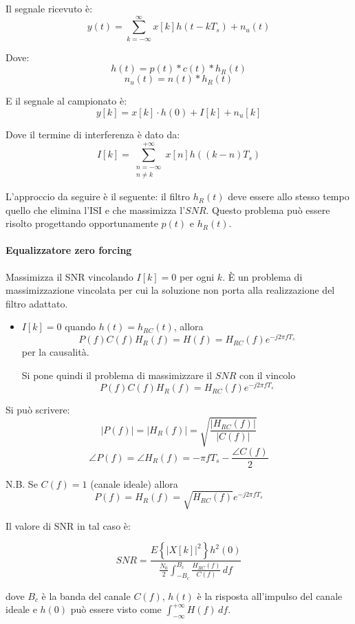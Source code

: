 \documentclass{article}
\begin{document}
Il segnale ricevuto è:
\[
y(t) = \sum_{k=-\infty}^{\infty} x[k] h(t - kT_s) + n_u(t)
\]

Dove:
\[
h(t) = p(t) * c(t) * h_R(t)
\]
\[
n_u(t) = n(t) * h_R(t)
\]

E il segnale al campionato è:
\[
y[k] = x[k] \cdot h(0) + I[k] + n_u[k]
\]

Dove il termine di interferenza è dato da:
\[
I[k] = \sum_{\substack{n=-\infty \\ n \neq k}}^{+\infty} x[n] h\left( (k-n)T_s \right)
\]

L'approccio da seguire è il seguente:
il filtro $h_R(t)$ deve essere allo stesso tempo quello che elimina l'ISI e che massimizza l'$SNR$. Questo problema può essere risolto progettando opportunamente $p(t)$ e $h_R(t)$.

\paragraph{Equalizzatore zero forcing}

Massimizza il SNR vincolando \( I[k] = 0 \) per ogni \( k \).  È un problema di massimizzazione vincolata per cui la soluzione non porta alla realizzazione del filtro adattato.

\begin{itemize}
    \item \( I[k] = 0 \) quando \( h(t) = h_{RC}(t) \), allora
    \[
    P(f) C(f) H_R(f) = H(f) = H_{RC}(f) e^{-j 2 \pi f T_s}
    \]
    per la causalità.
    
    Si pone quindi il problema di massimizzare il $SNR$ con il vincolo
    \[
    P(f) C(f) H_R(f) = H_{RC}(f) e^{-j 2 \pi f T_s}
    \]
\end{itemize}

Si può scrivere:
\[
\left| P(f) \right| = \left| H_R(f) \right| = \sqrt{\frac{\left| H_{RC}(f) \right|}{\left| C(f) \right|}}
\]
\[
\angle P(f) = \angle H_R(f) = - \pi f T_s - \frac{\angle C(f)}{2}
\]

N.B. Se \( C(f) = 1 \) (canale ideale) allora
\[
P(f) = H_R(f) = \sqrt{H_{RC}(f)} e^{-j 2 \pi f T_s}
\]

Il valore di SNR in tal caso è:



\[
SNR = \frac{E\left\{\left|X[k]\right|^2\right\} h^2(0)}{\frac{N_0}{2} 
\int_{-B_c}^{B_c} \frac{H_{RC}(f)}{C(f)}\, df }
\]

dove \( B_c \) è la banda del canale \( C(f) \), \( h(t) \) è la risposta all'impulso del canale ideale e $h(0)$ può essere visto come $
\int_{-\infty}^{+\infty} H(f)\, df$.
\end{document}
